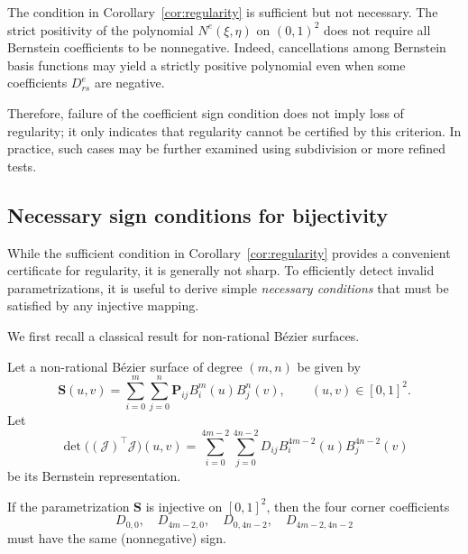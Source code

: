 \documentclass{jssc}
\begin{document}
\begin{remark}
The condition in Corollary~\ref{cor:regularity} is sufficient but not necessary. The strict positivity of the polynomial $N^e(\xi,\eta)$ on $(0,1)^2$ does not require all Bernstein coefficients to be nonnegative. Indeed, cancellations among Bernstein basis functions may yield a strictly positive polynomial even when some coefficients $D_{rs}^e$ are negative.

Therefore, failure of the coefficient sign condition does not imply loss of regularity; it only indicates that regularity cannot be certified by this criterion. In practice, such cases may be further examined using subdivision or more refined tests.
\end{remark}

\subsection{Necessary sign conditions for bijectivity}

While the sufficient condition in Corollary~\ref{cor:regularity} provides a convenient certificate for regularity, it is generally not sharp. 
To efficiently detect invalid parametrizations, it is useful to derive simple \emph{necessary conditions} that must be satisfied by any injective mapping.

We first recall a classical result for non-rational B\'ezier surfaces.

\begin{theorem}
\label{thm:corner}
Let a non-rational B\'ezier surface of degree $(m,n)$ be given by
\begin{equation}
\mathbf{S}(u,v)
=
\sum_{i=0}^{m}\sum_{j=0}^{n}
\mathbf{P}_{ij} B_i^m(u) B_j^n(v),
\qquad (u,v)\in[0,1]^2.
\end{equation}
Let
\begin{equation}
    \det\!\big((\bm{\mathcal{J}})^\top \bm{\mathcal{J}}\big)(u,v)
    =
    \sum_{i=0}^{4m-2}\sum_{j=0}^{4n-2}
    D_{ij} B_i^{4m-2}(u) B_j^{4n-2}(v)
\end{equation}
be its Bernstein representation. 

If the parametrization $\mathbf{S}$ is injective on $[0,1]^2$, then the four corner coefficients
\begin{equation}
    D_{0,0},\quad D_{4m-2,0},\quad D_{0,4n-2},\quad D_{4m-2,4n-2}
\end{equation}
must have the same (nonnegative) sign.
\end{theorem}
\end{document}
